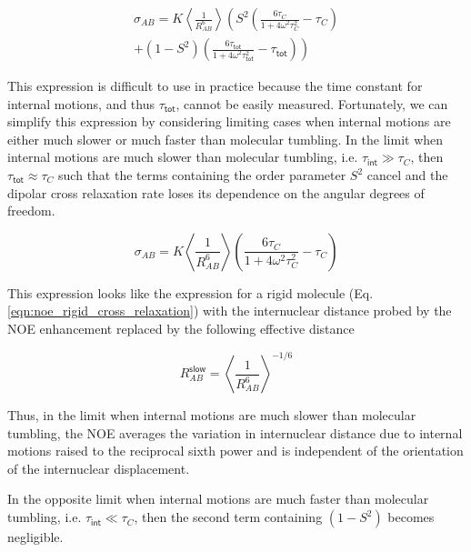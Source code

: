 \documentclass[9pt,review]{livecoms}
\begin{document}
\begin{equation}
\label{eqn:ls_cross_relaxation}
\begin{gathered}
\sigma_{AB} = K \left \langle \frac {1} {R_{AB}^6} \right \rangle \left( S^2 \left( \frac {6 \tau_C} {1 + 4 \omega^2 \tau_C^2} - \tau_C \right) \right. \\
\left. + (1 - S^2) \left( \frac {6 \tau_{\mathsf{tot}}} {1 + 4 \omega^2 \tau_{\mathsf{tot}}^2} - \tau_{\mathsf{tot}} \right) \right)
\end{gathered}
\end{equation}

This expression is difficult to use in practice because the time constant for internal motions, and thus $\tau_{\mathsf{tot}}$, cannot be easily measured.
Fortunately, we can simplify this expression by considering limiting cases when internal motions are either much slower or much faster than molecular tumbling.
In the limit when internal motions are much slower than molecular tumbling, i.e. $\tau_{\mathsf{int}} \gg \tau_C$, then $\tau_{\mathsf{tot}} \approx \tau_C$ such that the terms containing the order parameter $S^2$ cancel and the dipolar cross relaxation rate loses its dependence on the angular degrees of freedom.

\begin{equation}
\label{eqn:ls_slow_cross_relaxation}
\sigma_{AB} = K \left \langle \frac {1} {R_{AB}^6} \right \rangle \left( \frac {6 \tau_C} {1 + 4 \omega^2 \tau_C^2} - \tau_C \right)
\end{equation}

\noindent This expression looks like the expression for a rigid molecule (Eq. \ref{eqn:noe_rigid_cross_relaxation}) with the internuclear distance probed by the NOE enhancement replaced by the following effective distance

\begin{equation}
\label{eqn:ls_slow_effective_distance}
R_{AB}^{\mathsf{slow}} = \left \langle \frac {1} {R_{AB}^6} \right \rangle^{-1/6}
\end{equation}

\noindent Thus, in the limit when internal motions are much slower than molecular tumbling, the NOE averages the variation in internuclear distance due to internal motions raised to the reciprocal sixth power and is independent of the orientation of the internuclear displacement.

In the opposite limit when internal motions are much faster than molecular tumbling, i.e. $\tau_{\mathsf{int}} \ll \tau_C$, then the second term containing $(1 - S^2)$ becomes negligible.
\end{document}
